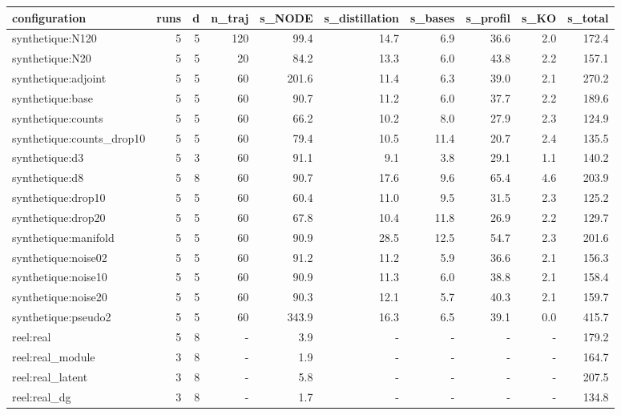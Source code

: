 \begin{tabular}{lrrrrrrrrr}
\hline
configuration & runs & d & n\_traj & s\_NODE & s\_distillation & s\_bases & s\_profil & s\_KO & s\_total \\
\hline
synthetique:N120 & 5 & 5 & 120 & 99.4 & 14.7 & 6.9 & 36.6 & 2.0 & 172.4 \\
synthetique:N20 & 5 & 5 & 20 & 84.2 & 13.3 & 6.0 & 43.8 & 2.2 & 157.1 \\
synthetique:adjoint & 5 & 5 & 60 & 201.6 & 11.4 & 6.3 & 39.0 & 2.1 & 270.2 \\
synthetique:base & 5 & 5 & 60 & 90.7 & 11.2 & 6.0 & 37.7 & 2.2 & 189.6 \\
synthetique:counts & 5 & 5 & 60 & 66.2 & 10.2 & 8.0 & 27.9 & 2.3 & 124.9 \\
synthetique:counts\_drop10 & 5 & 5 & 60 & 79.4 & 10.5 & 11.4 & 20.7 & 2.4 & 135.5 \\
synthetique:d3 & 5 & 3 & 60 & 91.1 & 9.1 & 3.8 & 29.1 & 1.1 & 140.2 \\
synthetique:d8 & 5 & 8 & 60 & 90.7 & 17.6 & 9.6 & 65.4 & 4.6 & 203.9 \\
synthetique:drop10 & 5 & 5 & 60 & 60.4 & 11.0 & 9.5 & 31.5 & 2.3 & 125.2 \\
synthetique:drop20 & 5 & 5 & 60 & 67.8 & 10.4 & 11.8 & 26.9 & 2.2 & 129.7 \\
synthetique:manifold & 5 & 5 & 60 & 90.9 & 28.5 & 12.5 & 54.7 & 2.3 & 201.6 \\
synthetique:noise02 & 5 & 5 & 60 & 91.2 & 11.2 & 5.9 & 36.6 & 2.1 & 156.3 \\
synthetique:noise10 & 5 & 5 & 60 & 90.9 & 11.3 & 6.0 & 38.8 & 2.1 & 158.4 \\
synthetique:noise20 & 5 & 5 & 60 & 90.3 & 12.1 & 5.7 & 40.3 & 2.1 & 159.7 \\
synthetique:pseudo2 & 5 & 5 & 60 & 343.9 & 16.3 & 6.5 & 39.1 & 0.0 & 415.7 \\
reel:real & 5 & 8 & - & 3.9 & - & - & - & - & 179.2 \\
reel:real\_module & 3 & 8 & - & 1.9 & - & - & - & - & 164.7 \\
reel:real\_latent & 3 & 8 & - & 5.8 & - & - & - & - & 207.5 \\
reel:real\_dg & 3 & 8 & - & 1.7 & - & - & - & - & 134.8 \\
\hline
\end{tabular}

